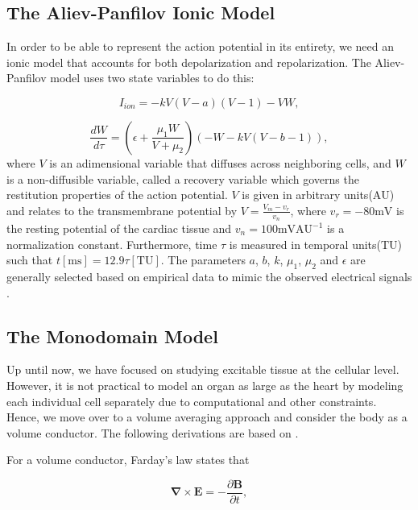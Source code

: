 \subsection{The Aliev-Panfilov Ionic Model} 
In order to be able to represent the action potential in its entirety, we need an ionic model that accounts for both depolarization and repolarization. The Aliev-Panfilov model uses two state variables to do this:

\begin{equation}
I_{ion}=-kV(V-a)(V-1)-VW,
    \label{eq:AP_ionic}
\end{equation}

\begin{equation}
\label{eq:dwdt}
    \frac{dW}{d\tau}= (\epsilon + \frac{\mu_1W}{V+\mu_2})(-W-kV(V-b-1)),
\end{equation}
where $V$ is an adimensional variable that diffuses across neighboring cells, and $W$ is a non-diffusible variable, called a recovery variable which governs the restitution properties of the action potential.
$V$ is given in arbitrary units($\mathrm{AU}$) and relates to the transmembrane potential by $V=\frac{V_m-v_r}{v_n}$, where $v_r=-80\mathrm{mV}$ is the resting potential of the cardiac tissue and $v_n=100\mathrm{mV}\mathrm{AU^{-1}}$ is a normalization constant. Furthermore, time $\tau$ is measured in temporal units($\mathrm{TU}$) such that $t[\mathrm{ms}]=12.9\tau[\mathrm{TU}]$. The parameters $a$, $b$, $k$, $\mu_1$, $\mu_2$ and $\epsilon$ are generally selected based on empirical data to mimic the observed electrical signals \cite{EP-PINNs}.

\subsection{The Monodomain Model}
Up until now, we have focused on studying excitable tissue at the cellular level. However, it is not practical to model an organ as large as the heart by modeling each individual cell separately due to computational and other constraints. Hence, we move over to a volume averaging approach and consider the body as a volume conductor. The following derivations are based on \cite{Lines2002_bidomain}.

For a volume conductor, Farday's law states that \cite{griffiths2013introduction}

\begin{equation}
    \mathbf{\nabla} \times \mathbf{E}=-\frac{\partial \mathbf{B}}{\partial t},
    \label{eq:faraday}
\end{equation}

